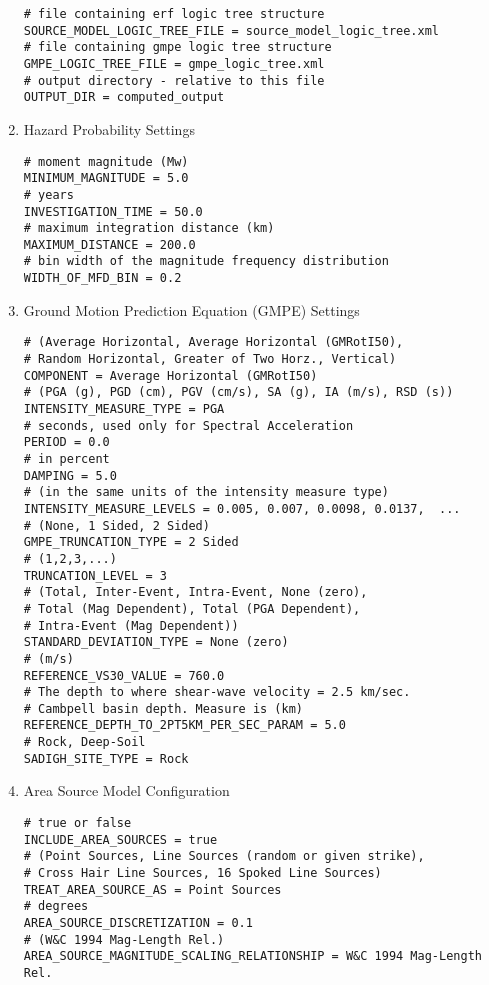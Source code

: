 \begin{enumerate}
\begin{Verbatim}[frame=single, commandchars=\\\{\}, fontsize=\small]
# file containing erf logic tree structure
SOURCE_MODEL_LOGIC_TREE_FILE = source_model_logic_tree.xml
# file containing gmpe logic tree structure
GMPE_LOGIC_TREE_FILE = gmpe_logic_tree.xml
# output directory - relative to this file
OUTPUT_DIR = computed_output
\end{Verbatim}
%
\item Hazard Probability Settings
\begin{Verbatim}[frame=single, commandchars=\\\{\}, fontsize=\small]
# moment magnitude (Mw)
MINIMUM_MAGNITUDE = 5.0
# years
INVESTIGATION_TIME = 50.0
# maximum integration distance (km)
MAXIMUM_DISTANCE = 200.0
# bin width of the magnitude frequency distribution
WIDTH_OF_MFD_BIN = 0.2
\end{Verbatim}
%
\item Ground Motion Prediction Equation (GMPE) Settings
\begin{Verbatim}[frame=single, commandchars=\\\{\}, fontsize=\small]
# (Average Horizontal, Average Horizontal (GMRotI50), 
# Random Horizontal, Greater of Two Horz., Vertical)
COMPONENT = Average Horizontal (GMRotI50)
# (PGA (g), PGD (cm), PGV (cm/s), SA (g), IA (m/s), RSD (s))
INTENSITY_MEASURE_TYPE = PGA
# seconds, used only for Spectral Acceleration
PERIOD = 0.0
# in percent
DAMPING = 5.0
# (in the same units of the intensity measure type)
INTENSITY_MEASURE_LEVELS = 0.005, 0.007, 0.0098, 0.0137,  ...
# (None, 1 Sided, 2 Sided)
GMPE_TRUNCATION_TYPE = 2 Sided
# (1,2,3,...)
TRUNCATION_LEVEL = 3
# (Total, Inter-Event, Intra-Event, None (zero), 
# Total (Mag Dependent), Total (PGA Dependent), 
# Intra-Event (Mag Dependent))
STANDARD_DEVIATION_TYPE = None (zero)
# (m/s)
REFERENCE_VS30_VALUE = 760.0
# The depth to where shear-wave velocity = 2.5 km/sec.
# Cambpell basin depth. Measure is (km)
REFERENCE_DEPTH_TO_2PT5KM_PER_SEC_PARAM = 5.0
# Rock, Deep-Soil
SADIGH_SITE_TYPE = Rock
\end{Verbatim}
%
\item Area Source Model Configuration 
\begin{Verbatim}[frame=single, commandchars=\\\{\}, fontsize=\small]
# true or false
INCLUDE_AREA_SOURCES = true
# (Point Sources, Line Sources (random or given strike), 
# Cross Hair Line Sources, 16 Spoked Line Sources)
TREAT_AREA_SOURCE_AS = Point Sources
# degrees
AREA_SOURCE_DISCRETIZATION = 0.1
# (W&C 1994 Mag-Length Rel.)
AREA_SOURCE_MAGNITUDE_SCALING_RELATIONSHIP = W&C 1994 Mag-Length Rel.
\end{Verbatim}


\end{enumerate}
